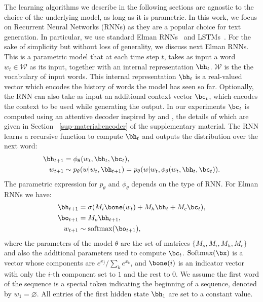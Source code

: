 The learning algorithms we describe in the following sections are agnostic to
the choice of the underlying model, as long as it is parametric. 
In this work, we focus on Recurrent Neural Networks (RNNs) as they are a popular choice for text generation. In particular, we use standard Elman RNNs~\citep{elman1990} and LSTMs~\citep{lstm}. For the sake of simplicity but without loss of generality, we discuss next Elman RNNs. This is a parametric 
model that at each time step $t$, takes as input a word $w_t \in \mathcal{W}$ as its input, together 
with an internal representation $\bh_t$. $\mathcal{W}$ is the the vocabulary of input words. 
This internal representation $\bh_t$ is a real-valued vector which encodes the history of 
words the model has seen so far. 
Optionally, the RNN can also take as input an  additional context vector $\bc_t$, which 
encodes the context to be used while generating the output. 
In our experiments $\bc_t$ is computed using an attentive decoder 
inspired by \cite{bahdanau-iclr2015} and \citet{rush-2015}, the details of which 
are given in Section ~\ref{sup-material:encoder} of the supplementary material. 
The RNN learns a recursive function to compute $\bh_t$ and 
outputs the distribution over the next word:
\begin{align}
    \bh_{t + 1} &= \phi_\theta(w_t, \bh_t, \bc_t),  \\
	w_{t+1} &\sim p_{\theta}(w |  w_t, \bh_{t+1}) =  p_{\theta}(w |  w_t, \phi_\theta(w_t, \bh_t, \bc_t)).
\end{align}
The parametric expression for $p_\theta$ and $\phi_\theta$ depends 
on the type of RNN. For Elman RNNs we have:
\begin{align}
\label{eq:elman-rnn}
    \bh_{t + 1} &= \sigma(M_i \bone(w_t) + M_h \bh_t + M_c \bc_t), \\
    \bo_{t+1} &= M_o \bh_{t+1}, \label{eq:softmax_input} \\
	w_{t+1} &\sim \mbox{softmax}(\bo_{t+1}),
    \label{eq:xent-distr}
\end{align}
where the parameters of the model $\theta$ are the set of matrices $\{M_o, M_i, M_h, M_c\}$ 
and also the additional parameters used to compute $\bc_t$. $\mbox{Softmax}(\bx)$ is a vector whose components are $e^{x_j} / \sum_k{e^{x_k}}$, and $\bone(i)$ is an indicator vector with only the $i$-th component set to $1$ and the rest to $0$. We assume the first word of the sequence is a special token indicating the beginning of a sequence, denoted by $w_1 = \varnothing$. All entries of the first hidden state $\bh_1$ are set to a constant value.

